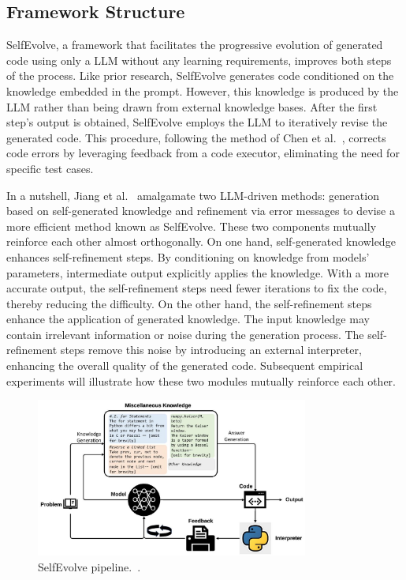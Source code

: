 \documentclass[a4paper,oneside]{book}
\begin{document}
\subsection{Framework Structure}
SelfEvolve, a framework that facilitates the progressive evolution of generated code using only a LLM without any learning requirements, improves both steps of the process. Like prior research, SelfEvolve generates code conditioned on the knowledge embedded in the prompt. However, this knowledge is produced by the LLM rather than being drawn from external knowledge bases. After the first step's output is obtained, SelfEvolve employs the LLM to iteratively revise the generated code. This procedure, following the method of Chen et al.~\cite{chen2023teaching}, corrects code errors by leveraging feedback from a code executor, eliminating the need for specific test cases.

In a nutshell, Jiang et al.~\cite{jiang2023selfevolve} amalgamate two LLM-driven methods: generation based on self-generated knowledge and refinement via error messages to devise a more efficient method known as SelfEvolve. These two components mutually reinforce each other almost orthogonally. On one hand, self-generated knowledge enhances self-refinement steps. By conditioning on knowledge from models' parameters, intermediate output explicitly applies the knowledge. With a more accurate output, the self-refinement steps need fewer iterations to fix the code, thereby reducing the difficulty. On the other hand, the self-refinement steps enhance the application of generated knowledge. The input knowledge may contain irrelevant information or noise during the generation process. The self-refinement steps remove this noise by introducing an external interpreter, enhancing the overall quality of the generated code. Subsequent empirical experiments will illustrate how these two modules mutually reinforce each other.

\begin{figure}[!htb]
    \centering
    \includegraphics[width=0.8\textwidth]{img/selfevolve}
    \caption{SelfEvolve pipeline.~\cite{jiang2023selfevolve}.}\label{fig:selfevolve}
\end{figure}
\end{document}
